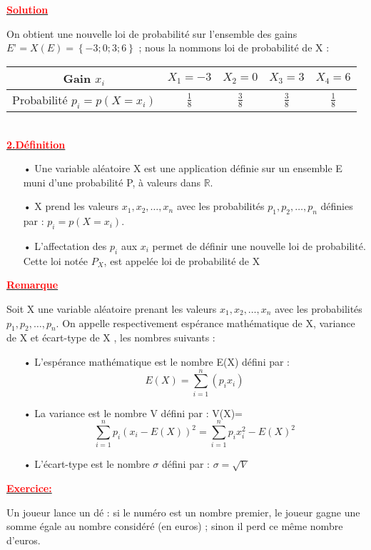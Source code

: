 \documentclass[12pt]{article}
\begin{document}
\underline{\textbf{\textcolor{red}{Solution}}}

On obtient une nouvelle loi de probabilité sur l’ensemble des gains\\
$E’ = X(E) = \left\lbrace -3 ;0 ;3 ;6 \right\rbrace $ ; nous la nommons loi de probabilité de X :
\\
\begin{tabular}{|c|c|c|c|c|}
\hline
Gain $x_{i}$ & $X_{1}=-3$ & $X_{2}=0$ & $X_{3}=3$&$X_{4}=6$\\
\hline
Probabilité $p_{i} = p(X = x_{i}) $ &$\frac{1}{8}$ &$\frac{3}{8}$&$\frac{3}{8}$&$\frac{1}{8}$ \\
\hline
\end{tabular}
\\
\underline{\textbf{\textcolor{red}{2.Définition}}}
\begin{itemize}
\item[•] Une variable aléatoire X est une application définie sur un ensemble E muni d’une
probabilité P, à valeurs dans $\mathbb{R}$.
\item[•] X prend les valeurs $x_{1}, x_{2}, …, x_{n}$ avec les probabilités $p_{1}, p_{2}, …, p_{n}$ définies par : $p_{i} = p(X = x_{i})$.
\item[•] L’affectation des $p_{i}$ aux $x_{i}$ permet de définir une nouvelle loi de probabilité. Cette loi notée $P_{X}$, est appelée
loi de probabilité de X
\end{itemize} 
\underline{\textbf{\textcolor{red}{Remarque}}}

Soit X une variable aléatoire prenant les valeurs $x_{1}, x_{2}, …, x_{n}$ avec les probabilités $p_{1}, p_{2}, …, p_{n}$. On appelle respectivement espérance mathématique de X,
variance de X et écart-type de X , les nombres suivants :
\begin{itemize}
\item[•] L’espérance mathématique est le nombre E(X) défini par : \[E(X)=\sum_{i=1}^{n}(p_{i}x_{i})\]
\item[•] La variance est le nombre V défini par : V(X)=\[\sum_{i=1}^{n}p_{i}(x_{i}-E(X))^{2}=\sum_{i=1}^{n}p_{i}x_{i}^{2}-E(X)^{2}\]
\item[•]  L’écart-type est le nombre $\sigma$ défini par : $\sigma = \sqrt{V}$
\end{itemize}
\underline{\textbf{\textcolor{red}{Exercice:}}}

Un joueur lance un dé : si le numéro est un nombre premier, le joueur gagne une somme égale au nombre considéré (en euros) ; sinon il perd ce même nombre d’euros.
\end{document}
